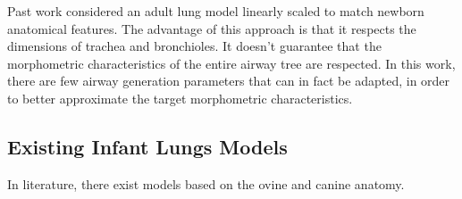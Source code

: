 
Past work\cite{mani2020} considered an adult lung model linearly
scaled to match newborn anatomical features.  The advantage of this
approach is that it respects the dimensions of trachea and
bronchioles. It doesn't guarantee that the morphometric
characteristics of the entire airway tree are respected.  In this
work, there are few airway generation parameters that can in fact be
adapted, in order to better approximate the target morphometric
characteristics.

\subsection{Existing Infant Lungs Models}

In literature, there exist models based on the
ovine\cite{al-jumaily2011} and canine\cite{herrmann2016} anatomy.

